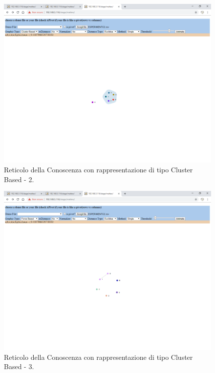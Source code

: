 \noindent\\
\begin{figure}[H]
\centering
	\includegraphics[width=1\linewidth]{./image/reticoloNonCorretto3.png}
	\caption{Reticolo della Conoscenza con rappresentazione di tipo Cluster Based - 2.}
	\label{Reticolo della Conoscenza con rappresentazione di tipo Cluster Based - 2.}
\end{figure}
\noindent
\begin{figure}[H]
\centering
	\includegraphics[width=1\linewidth]{./image/reticoloNonCorretto4.png}
	\caption{Reticolo della Conoscenza con rappresentazione di tipo Cluster Based - 3.}
	\label{Reticolo della Conoscenza con rappresentazione di tipo Cluster Based - 3.}
\end{figure}
